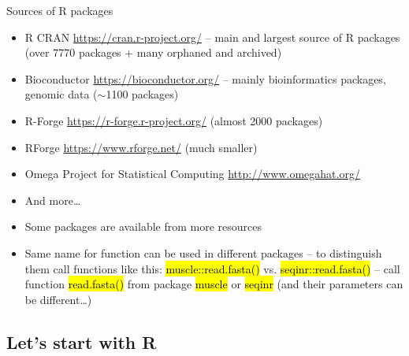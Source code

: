 \documentclass[compress, ucs, xelatex, 11pt, xcolor=svgnames,
  hyperref={
    bookmarks=true,
    unicode=true,
    colorlinks=true,
    pdftitle={Molecular data in R},
    plainpages=false,
    pdfauthor={Vojtech Zeisek},
    pdfsubject={Course about phylogeny and evolution in R},
    pdfcreator={XeLaTeX},
    pdfkeywords={R, evolution, phylogeny, molecular data},
    linkcolor=Tomato,
    anchorcolor=SaddleBrown,
    citecolor=Goldenrod,
    filecolor=DarkMagenta,
    menucolor=Sienna,
    urlcolor=DarkTurquoise,
    pdftex},
  url={hyphens, lowtilde} %
  ]{beamer}
\renewcommand{\texttt}[1]{\hl{\ttfamily #1}}
\begin{document}
\begin{frame}{Sources of R packages}
\begin{itemize}
 \item R CRAN \url{https://cran.r-project.org/} -- main and largest source of R packages (over 7770 packages + many orphaned and archived)
 \item Bioconductor \url{https://bioconductor.org/} -- mainly bioinformatics packages, genomic data ($\sim$1100 packages)
 \item R-Forge \url{https://r-forge.r-project.org/} (almost 2000 packages)
 \item RForge \url{https://www.rforge.net/} (much smaller)
 \item Omega Project for Statistical Computing \url{http://www.omegahat.org/}
 \item And more\ldots
 \item Some packages are available from more resources
 \item Same name for function can be used in different packages -- to distinguish them call functions like this: \texttt{muscle::read.fasta()} vs. \texttt{seqinr::read.fasta()} -- call function \texttt{read.fasta()} from package \texttt{muscle} \alert{or} \texttt{seqinr} (and their parameters can be different\ldots)
\end{itemize}
\end{frame}

\subsection{Let's start with R}
\end{document}

